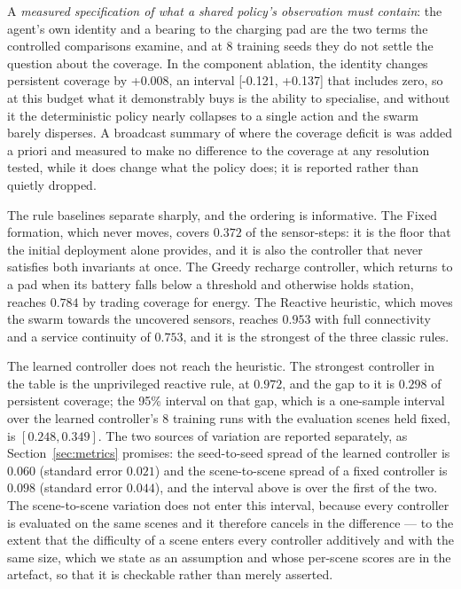 
    \item A \emph{measured specification of what a shared policy's observation must contain}: the agent's own identity and a bearing to the charging pad are the two terms the controlled comparisons examine, and at 8 training seeds they do not settle the question about the coverage.  In the component ablation, the identity changes persistent coverage by +0.008, an interval [-0.121, +0.137] that includes zero, so at this budget what it demonstrably buys is the ability to specialise, and without it the deterministic policy nearly collapses to a single action and the swarm barely disperses.  A broadcast summary of where the coverage deficit is was added a priori and measured to make no difference to the coverage at any resolution tested, while it does change what the policy does; it is reported rather than quietly dropped.


The rule baselines separate sharply, and the ordering is informative.  The
Fixed formation, which never moves, covers $0.372$ of the sensor-steps:
it is the floor that the initial deployment alone provides, and it is also
the controller that never satisfies both invariants at once.  The Greedy
recharge controller, which returns to a pad when its battery falls below a
threshold and otherwise holds station, reaches $0.784$ by trading
coverage for energy.  The Reactive heuristic, which moves the swarm towards
the uncovered sensors, reaches $0.953$ with full connectivity and a
service continuity of $0.753$, and it is the strongest of the three
classic rules.

The learned controller does not reach the heuristic.  The strongest
controller in the table is the unprivileged reactive rule, at $0.972$, and
the gap to it is $0.298$ of persistent coverage; the 95\% interval on
that gap, which is a one-sample interval over the learned controller's
8 training runs with the evaluation scenes held fixed, is
$[0.248, 0.349]$.  The two sources of variation are reported separately, as
Section~\ref{sec:metrics} promises: the seed-to-seed spread of the
learned controller is $0.060$ (standard error $0.021$) and
the scene-to-scene spread of a fixed controller is $0.098$ (standard
error $0.044$), and the interval above is over the first of the
two.  The scene-to-scene variation does not enter this
interval, because every controller is evaluated on the same scenes and it
therefore cancels in the difference --- to the extent that the difficulty
of a scene enters every controller additively and with the same size,
which we state as an assumption and whose per-scene scores are in the
artefact, so that it is checkable rather than merely asserted.

